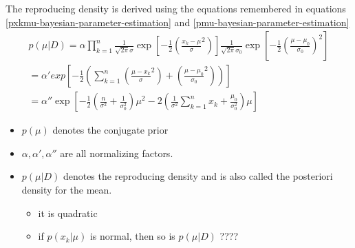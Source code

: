 \documentclass[11pt]{article}
\begin{document}
\begin{itemize}
	The reproducing density is derived using the equations remembered in equations \ref{pxkmu-bayesian-parameter-estimation} and \ref{pmu-bayesian-parameter-estimation}
	\begin{eqnarray}
		p( \mu | D ) = \alpha \prod _{k=1}^n  \frac{1} {\sqrt{2\pi} \sigma} \exp [ -\frac{1}{2}(\frac{x_k - \mu}{\sigma}^2) ] \frac{1}{\sqrt{2\pi} \sigma_0} \exp [-\frac{1}{2} ( \frac{\mu - \mu_0}{\sigma_0}) ^2] \\
		 = \alpha' exp [ - \frac{1}{2} ( \sum_{k=1}^n (\frac{\mu - x_k}{\sigma}^2) + (\frac{\mu - \mu_0}{\sigma_0}^2) ) ] \\
		= \alpha '' \exp [- \frac{1}{2} ( \frac{n}{\sigma^2} + \frac{1}{\sigma_0 ^2}) \mu^2 - 2 (\frac{1}{\sigma^2} \sum_{k=1} ^n x_k  + \frac{\mu_0}{\sigma_0 ^2})\mu ] 
	\end{eqnarray}
	\begin{itemize}
		\item $p(\mu)$ denotes the conjugate prior
		\item $\alpha , \alpha' , \alpha''$ are all normalizing factors.
		\item $p(\mu | D)$ denotes the reproducing density and is also called the posteriori density for the mean.
		\begin{itemize}
			\item it is quadratic
			\item if $p(x_k| \mu)$ is normal, then so is $p(\mu | D)$ ????
		\end{itemize}
		
	\end{itemize}
	

\end{itemize}
\end{document}
